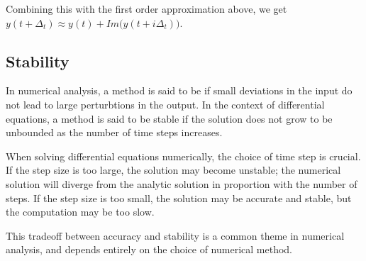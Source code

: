 \par Combining this with the first order approximation above, we get $y(t + \Delta_t) \approx y(t) + Im\big(y(t+i\Delta_t)\big)$.


\subsection{Stability}
\par In numerical analysis, a method is said to be  if small deviations in the input do not lead to large perturbtions in the output.
In the context of differential equations, a method is said to be stable if the solution does not grow to be unbounded as the number of time steps increases.

\par When solving differential equations numerically, the choice of time step is crucial.
If the step size is too large, the solution may become unstable; the numerical solution will diverge from the analytic solution in proportion with the number of steps.
If the step size is too small, the solution may be accurate and stable, but the computation may be too slow.

\par This tradeoff between accuracy and stability is a common theme in numerical analysis, and depends entirely on the choice of numerical method.
